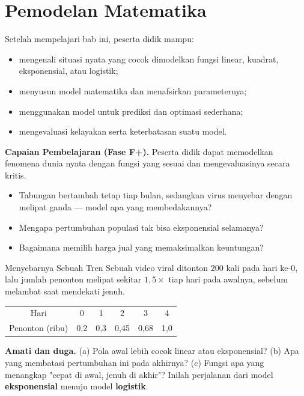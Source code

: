 \documentclass[11pt,a4paper]{report}
\theoremstyle{gaya}
\begin{document}
\chapter{Pemodelan Matematika}
\begin{tujuan}
Setelah mempelajari bab ini, peserta didik mampu:
\begin{itemize}[leftmargin=*,topsep=2pt]
  \item mengenali situasi nyata yang cocok dimodelkan fungsi linear, kuadrat, eksponensial, atau logistik;
  \item menyusun model matematika dan menafsirkan parameternya;
  \item menggunakan model untuk prediksi dan optimasi sederhana;
  \item mengevaluasi kelayakan serta keterbatasan suatu model.
\end{itemize}
\textbf{Capaian Pembelajaran (Fase F+).} Peserta didik dapat memodelkan fenomena dunia nyata dengan fungsi yang sesuai dan mengevaluasinya secara kritis.
\end{tujuan}

\begin{pemantik}
\begin{itemize}[leftmargin=*,topsep=2pt]
  \item Tabungan bertambah tetap tiap bulan, sedangkan virus menyebar dengan melipat ganda --- model apa yang membedakannya?
  \item Mengapa pertumbuhan populasi tak bisa eksponensial selamanya?
  \item Bagaimana memilih harga jual yang memaksimalkan keuntungan?
\end{itemize}
\end{pemantik}

\begin{studikasus}{Menyebarnya Sebuah Tren}
Sebuah video viral ditonton $200$ kali pada hari ke-0, lalu jumlah penonton melipat sekitar $1{,}5\times$ tiap hari pada awalnya, sebelum melambat saat mendekati jenuh.
\begin{center}
\begin{tabular}{c|ccccc}
\toprule
Hari & 0 & 1 & 2 & 3 & 4 \\
Penonton (ribu) & 0{,}2 & 0{,}3 & 0{,}45 & 0{,}68 & 1{,}0 \\
\bottomrule
\end{tabular}
\end{center}
\textbf{Amati dan duga.} (a) Pola awal lebih cocok linear atau eksponensial? (b) Apa yang membatasi pertumbuhan ini pada akhirnya? (c) Fungsi apa yang menangkap "cepat di awal, jenuh di akhir"? Inilah perjalanan dari model \textbf{eksponensial} menuju model \textbf{logistik}.
\end{studikasus}
\end{document}
